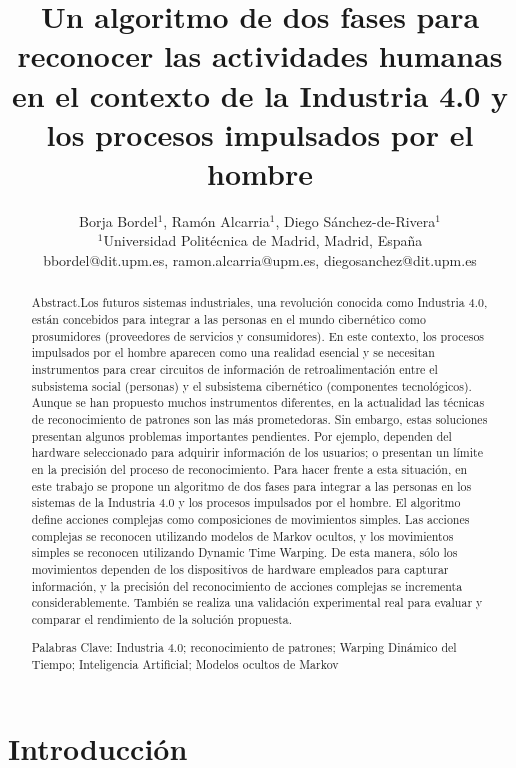 \documentclass[a4paper]{article}
\title{Un algoritmo de dos fases para reconocer las actividades humanas en el contexto de la Industria 4.0 y los procesos impulsados por el hombre}
\author{Borja Bordel$^1$, Ramón Alcarria$^1$, Diego Sánchez-de-Rivera$^1$\\
  \small $^1$Universidad Politécnica de Madrid, Madrid, España\\
  \small bbordel@dit.upm.es, ramon.alcarria@upm.es, diegosanchez@dit.upm.es\\
  \date{}
}
\begin{document}
\maketitle

\begin{abstract}
\centering
Abstract.Los futuros sistemas industriales, una revolución conocida como Industria 4.0, están concebidos para integrar a las personas en el mundo cibernético como prosumidores (proveedores de servicios y consumidores). En este contexto, los procesos impulsados por el hombre aparecen como una realidad esencial y se necesitan instrumentos para crear circuitos de información de retroalimentación entre el subsistema social (personas) y el subsistema cibernético (componentes tecnológicos). Aunque se han propuesto muchos instrumentos diferentes, en la actualidad las técnicas de reconocimiento de patrones son las más prometedoras. Sin embargo, estas soluciones presentan algunos problemas importantes pendientes. Por ejemplo, dependen del hardware seleccionado para adquirir información de los usuarios; o presentan un límite en la precisión del proceso de reconocimiento. Para hacer frente a esta situación, en este trabajo se propone un algoritmo de dos fases para integrar a las personas en los sistemas de la Industria 4.0 y los procesos impulsados por el hombre. El algoritmo define acciones complejas como composiciones de movimientos simples. Las acciones complejas se reconocen utilizando modelos de Markov ocultos, y los movimientos simples se reconocen utilizando Dynamic Time Warping. De esta manera, sólo los movimientos dependen de los dispositivos de hardware empleados para capturar información, y la precisión del reconocimiento de acciones complejas se incrementa considerablemente. También se realiza una validación experimental real para evaluar y comparar el rendimiento de la solución propuesta.

Palabras Clave: Industria 4.0; reconocimiento de patrones; Warping Dinámico del Tiempo; Inteligencia Artificial; Modelos ocultos de Markov
\end{abstract}


\section{Introducci\'on}
\end{document}
